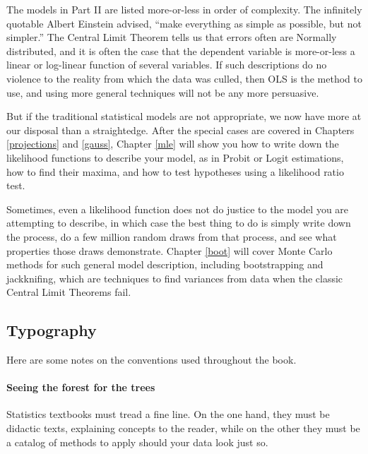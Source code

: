 The models in Part II are listed more-or-less in order of complexity.
The infinitely quotable Albert Einstein advised, ``make everything as
simple as possible, but not simpler.''  
The Central Limit Theorem tells us that errors often are
Normally distributed, and it is often the case that the dependent
variable is more-or-less a linear or log-linear function of several
variables. If such descriptions do no violence to the reality from
which the data was culled, then OLS is the method to use, and using more
general techniques will not be any more persuasive. 

But if the traditional statistical models are not appropriate, we now have
more at our disposal than a straightedge.
After the special cases are covered in Chapters \ref{projections}
and \ref{gauss}, Chapter \ref{mle} will show you how to write down the
likelihood functions to describe your model, as in Probit or Logit
estimations, how to find their maxima, and how to test hypotheses using
a likelihood ratio test.

Sometimes, even a likelihood function does not do justice to the model
you are attempting to describe, in which case the best thing to do is
simply write down the process, do a few million random draws from
that process, and see what properties those draws demonstrate.
Chapter \ref{boot} will cover Monte Carlo methods for such general
model description, including bootstrapping and jackknifing, which are
techniques to find variances from data when the classic Central Limit
Theorems fail.  

  

\subsection{Typography}
Here are some notes on the conventions used throughout the book.


\paragraph{\treesymbol Seeing the forest for the trees} Statistics textbooks
must tread a fine line. On the one hand, they must be didactic texts,
explaining concepts to the reader, while on the other they must be a
catalog of methods to apply should your data look just so.


